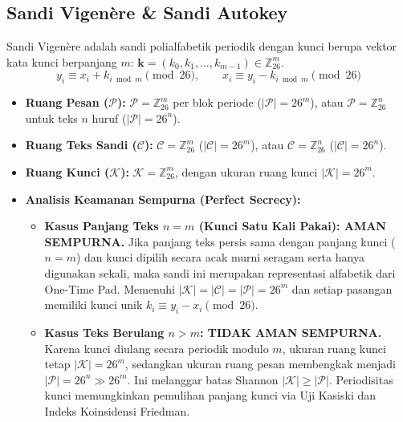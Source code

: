 \documentclass[11pt,a4paper]{article}
\begin{document}
\subsection{Sandi Vigen\`ere \& Sandi Autokey}
Sandi Vigen\`ere adalah sandi polialfabetik periodik dengan kunci berupa vektor kata kunci berpanjang $m$: $\mathbf{k} = (k_0, k_1, \dots, k_{m-1}) \in \mathbb{Z}_{26}^m$.
\[
y_i \equiv x_i + k_{i \bmod m} \pmod{26}, \qquad x_i \equiv y_i - k_{i \bmod m} \pmod{26}
\]
\begin{itemize}[leftmargin=*]
    \item \textbf{Ruang Pesan ($\mathcal{P}$):} $\mathcal{P} = \mathbb{Z}_{26}^m$ per blok periode ($|\mathcal{P}| = 26^m$), atau $\mathcal{P} = \mathbb{Z}_{26}^n$ untuk teks $n$ huruf ($|\mathcal{P}| = 26^n$).
    \item \textbf{Ruang Teks Sandi ($\mathcal{C}$):} $\mathcal{C} = \mathbb{Z}_{26}^m$ ($|\mathcal{C}| = 26^m$), atau $\mathcal{C} = \mathbb{Z}_{26}^n$ ($|\mathcal{C}| = 26^n$).
    \item \textbf{Ruang Kunci ($\mathcal{K}$):} $\mathcal{K} = \mathbb{Z}_{26}^m$, dengan ukuran ruang kunci $|\mathcal{K}| = 26^m$.
    \item \textbf{Analisis Keamanan Sempurna (Perfect Secrecy):}
    \begin{itemize}
        \item \textbf{Kasus Panjang Teks $n = m$ (Kunci Satu Kali Pakai): AMAN SEMPURNA.} Jika panjang teks persis sama dengan panjang kunci ($n = m$) dan kunci dipilih secara acak murni seragam serta hanya digunakan sekali, maka sandi ini merupakan representasi alfabetik dari One-Time Pad. Memenuhi $|\mathcal{K}| = |\mathcal{C}| = |\mathcal{P}| = 26^m$ dan setiap pasangan memiliki kunci unik $k_i \equiv y_i - x_i \pmod{26}$.
        \item \textbf{Kasus Teks Berulang $n > m$: TIDAK AMAN SEMPURNA.} Karena kunci diulang secara periodik modulo $m$, ukuran ruang kunci tetap $|\mathcal{K}| = 26^m$, sedangkan ukuran ruang pesan membengkak menjadi $|\mathcal{P}| = 26^n \gg 26^m$. Ini melanggar batas Shannon $|\mathcal{K}| \ge |\mathcal{P}|$. Periodisitas kunci memungkinkan pemulihan panjang kunci via Uji Kasiski dan Indeks Koinsidensi Friedman.
    \end{itemize}
\end{itemize}
\end{document}
